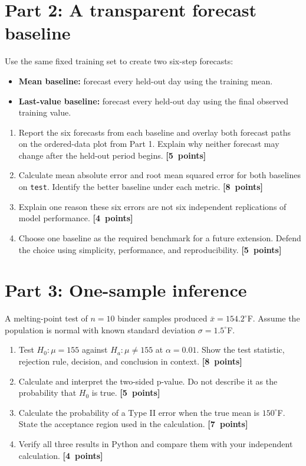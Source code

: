 \documentclass[11pt]{article}
\newcommand{\points}[1]{\nobreak\hfill\mbox{\textcolor{GTBlue}{\textbf{[#1 points]}}}}
\begin{document}
\section*{Part 2: A transparent forecast baseline}

Use the same fixed training set to create two six-step forecasts:
\begin{itemize}
  \item \textbf{Mean baseline:} forecast every held-out day using the training mean.
  \item \textbf{Last-value baseline:} forecast every held-out day using the final observed training value.
\end{itemize}

\begin{enumerate}[label=\textbf{2\alph*.}]
  \item Report the six forecasts from each baseline and overlay both forecast paths on the ordered-data plot from Part 1. Explain why neither forecast may change after the held-out period begins. \points{5}
  \item Calculate mean absolute error and root mean squared error for both baselines on \texttt{test}. Identify the better baseline under each metric. \points{8}
  \item Explain one reason these six errors are not six independent replications of model performance. \points{4}
  \item Choose one baseline as the required benchmark for a future extension. Defend the choice using simplicity, performance, and reproducibility. \points{5}
\end{enumerate}

\section*{Part 3: One-sample inference}

A melting-point test of $n=10$ binder samples produced $\bar x=154.2^\circ$F. Assume the population is normal with known standard deviation $\sigma=1.5^\circ$F.

\begin{enumerate}[label=\textbf{3\alph*.}]
  \item Test $H_0:\mu=155$ against $H_a:\mu\neq155$ at $\alpha=0.01$. Show the test statistic, rejection rule, decision, and conclusion in context. \points{8}
  \item Calculate and interpret the two-sided p-value. Do not describe it as the probability that $H_0$ is true. \points{5}
  \item Calculate the probability of a Type II error when the true mean is $150^\circ$F. State the acceptance region used in the calculation. \points{7}
  \item Verify all three results in Python and compare them with your independent calculation. \points{4}
\end{enumerate}
\end{document}
